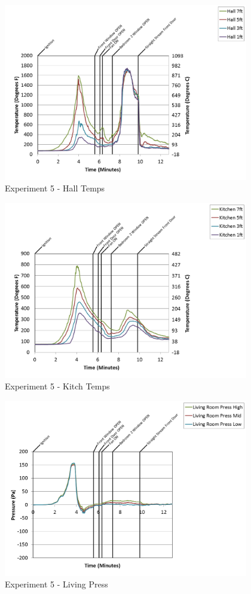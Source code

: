\documentclass{article}
\begin{document}
\begin{appendices}
\clearpage

\begin{figure}[h!]
	\centering
	\includegraphics[height=3.05in]{0_Images/Results_Charts/Exp_5_Charts/HallTemps.png}
	\caption{Experiment 5 - Hall Temps}
\end{figure}


\begin{figure}[h!]
	\centering
	\includegraphics[height=3.05in]{0_Images/Results_Charts/Exp_5_Charts/KitchTemps.png}
	\caption{Experiment 5 - Kitch Temps}
\end{figure}

\clearpage

\begin{figure}[h!]
	\centering
	\includegraphics[height=3.05in]{0_Images/Results_Charts/Exp_5_Charts/LivingPress.png}
	\caption{Experiment 5 - Living Press}
\end{figure}



\end{appendices}
\end{document}
